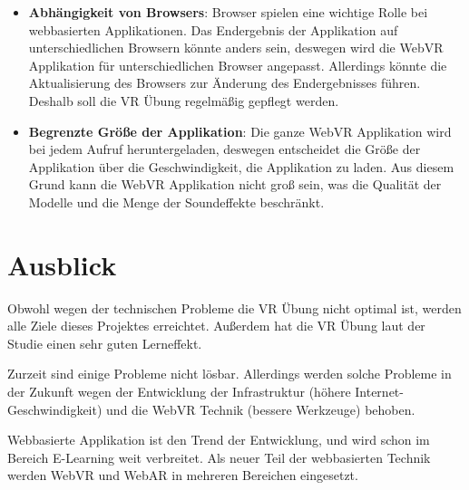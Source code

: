\begin{itemize}
    \item \textbf{Abhängigkeit von Browsers}: Browser spielen eine wichtige Rolle bei webbasierten Applikationen. Das Endergebnis der Applikation auf unterschiedlichen Browsern könnte anders sein, deswegen wird die WebVR Applikation für unterschiedlichen Browser angepasst. Allerdings könnte die Aktualisierung des Browsers zur Änderung des Endergebnisses führen. Deshalb soll die VR Übung regelmäßig gepflegt werden.
    
    \item \textbf{Begrenzte Größe der Applikation}: Die ganze WebVR Applikation wird bei jedem Aufruf heruntergeladen, deswegen entscheidet die Größe der Applikation über die Geschwindigkeit, die Applikation zu laden. Aus diesem Grund kann die WebVR Applikation nicht groß sein, was die Qualität der Modelle und die Menge der Soundeffekte beschränkt.
\end{itemize}

\section{Ausblick}

Obwohl wegen der technischen Probleme die VR Übung nicht optimal ist, werden alle Ziele dieses Projektes erreichtet. Außerdem hat die VR Übung laut der Studie einen sehr guten Lerneffekt.

Zurzeit sind einige Probleme nicht lösbar. Allerdings werden solche Probleme in der Zukunft wegen der Entwicklung der Infrastruktur (höhere Internet-Geschwindigkeit) und die WebVR Technik (bessere Werkzeuge) behoben.

Webbasierte Applikation ist den Trend der Entwicklung, und wird schon im Bereich E-Learning weit verbreitet. Als neuer Teil der webbasierten Technik werden WebVR und WebAR in mehreren Bereichen eingesetzt.


